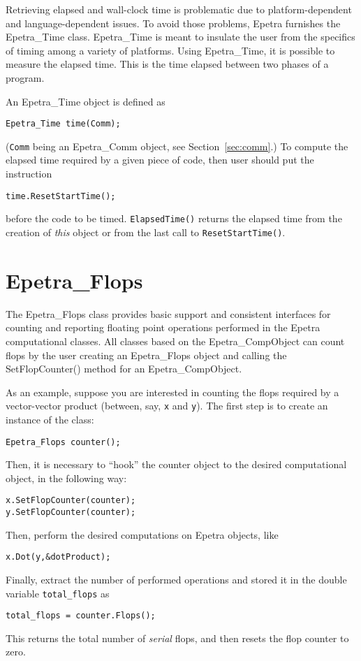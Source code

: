 Retrieving elapsed and wall-clock time is problematic due to
platform-dependent and language-dependent issues. To avoid those
problems, Epetra furnishes the Epetra\_Time class.  Epetra\_Time is
meant to insulate the user from the specifics of timing among a variety
of platforms.  Using Epetra\_Time, it is possible to measure the elapsed
time. This is the time elapsed between two phases of a program.

An Epetra\_Time object is defined as
\begin{verbatim}
Epetra_Time time(Comm);
\end{verbatim}
(\verb!Comm! being an Epetra\_Comm object, see Section~\ref{sec:comm}.)
To compute the elapsed time required by a given piece of code, then user
should put the instruction
\begin{verbatim}
time.ResetStartTime();
\end{verbatim}
before the code to be timed. \verb!ElapsedTime()!  returns the elapsed
time from the creation of {\sl this} object or from the last call to
\verb!ResetStartTime()!.


\section{Epetra\_Flops}
\label{sec:flops}

The Epetra\_Flops class provides basic support and consistent interfaces
for counting and reporting floating point operations performed in the
Epetra computational classes. All classes based on the
Epetra\_CompObject can count flops by the user creating an Epetra\_Flops
object and calling the SetFlopCounter() method for an
Epetra\_CompObject.

As an example, suppose you are interested in counting the flops required
by a vector-vector product (between, say, \verb!x! and \verb!y!).  The
first step is to create an instance of the class:
\begin{verbatim}
Epetra_Flops counter();
\end{verbatim}
Then, it is necessary to ``hook'' the counter object to the desired
computational object, in the following way:
\begin{verbatim}
x.SetFlopCounter(counter);
y.SetFlopCounter(counter);
\end{verbatim}
Then, perform the desired computations on Epetra objects, like
\begin{verbatim}
x.Dot(y,&dotProduct);
\end{verbatim}
Finally, extract the number of performed operations and stored it in the
double variable \verb!total_flops! as
\begin{verbatim}
total_flops = counter.Flops();
\end{verbatim}
This returns the total number of {\sl serial} flops, and then resets the
flop counter to zero.


